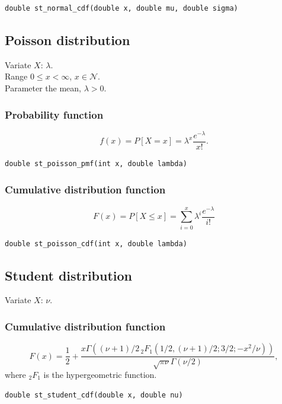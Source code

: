 \begin{verbatim}
double st_normal_cdf(double x, double mu, double sigma)
\end{verbatim}

\subsection{Poisson distribution}

\noindent
Variate $X$: $\lambda$.\\
Range $0 \leq x < \infty$, $x \in \mathcal{N}$.\\
Parameter the mean, $\lambda > 0$.

\subsubsection{Probability function}
\[
f(x) = P[X=x] = \lambda^x \frac{e^{-\lambda}}{x!}.
\]
\begin{verbatim}
double st_poisson_pmf(int x, double lambda)
\end{verbatim}

\subsubsection{Cumulative distribution function}

\[
F(x) = P[X \leq x] = \sum_{i = 0}^x \lambda^i \frac{e^{-\lambda}}{i!}
\]

\begin{verbatim}
double st_poisson_cdf(int x, double lambda)
\end{verbatim}

\subsection{Student distribution}

\noindent
Variate $X$: $\nu$.

\subsubsection{Cumulative distribution function}

\[
F(x) = \frac{1}{2} + \frac{x \Gamma((\nu+1)/2 \,_2F_1(1/2,(\nu+1)/2;3/2;-x^2/\nu))}{\sqrt{\pi\nu}\Gamma(\nu/2)},
\]
where $_2F_1$ is the hypergeometric function.

\begin{verbatim}
double st_student_cdf(double x, double nu)
\end{verbatim}


